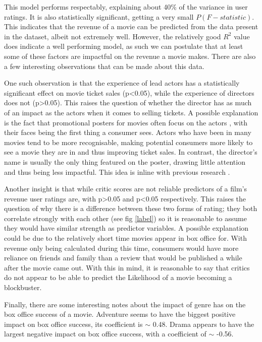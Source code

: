     This model performs respectably, explaining about  40\% of the variance in user ratings.
    It is also statistically significant, getting a very small  $P(F-statistic)$.
    This indicates that the revenue of a movie can be predicted from the data present in the dataset,
        albeit not extremely well.
    However, the relatively good $R^2$ value does indicate a well performing model, as such
        we can postulate that at least some of these factors are impactful on the revenue a 
        movie makes.
    There are also a few interesting observations that can be made about this data.

    One such observation is that the experience of lead actors has a statistically significant effect
        on movie ticket sales (p<0.05), while the experience of directors does not (p>0.05). 
    This raises the question of whether the director has as much of an impact as the actors when it
        comes to selling tickets.
    A possible explanation is the fact that promotional posters for movies often focus on the
        actors \cite{label}, with their faces being the first thing a consumer sees.
    Actors who have been in many movies tend to be more recognisable, making potential consumers more
        likely to see a movie they are in and thus improving ticket sales.
    In contrast, the director's name is usually the only thing featured on the poster, drawing little
        attention and thus being less impactful.
    This idea is inline with previous research \cite{label}.

    Another insight is that while critic scores are not reliable predictors of a
        film's revenue user ratings are, with p>0.05 and p<0.05 respectively.
    This raises the question of why there is a difference between these two forms of rating; they both correlate
        strongly with each other (see fig \ref{label}) so it is reasonable to assume they would have similar 
        strength as predictor variables.
    A possible explanation could be due to the relatively short time movies appear in box office for.
    With revenue only being calculated during this time, consumers would have more reliance on friends
        and family than a review that would be published a while after the movie came out.
    With this in mind, it is reasonable to say that critics do not appear to be able to predict the Likelihood
        of a movie becoming a blockbuster.
    
    Finally, there are some interesting notes about the impact of genre has on the box office success of a movie.
    Adventure seems to have the biggest positive impact on box office success, its coefficient is $\sim$ 0.48.
    Drama appears to have the largest negative impact on box office success, with a coefficient of $\sim$ -0.56.




